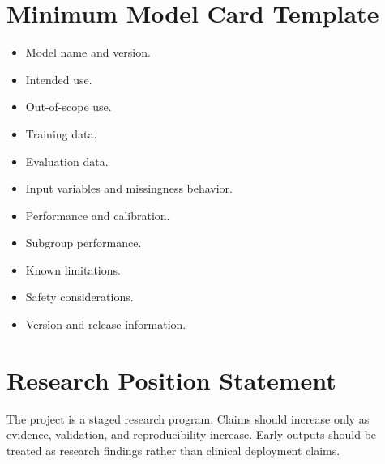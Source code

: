 \documentclass[11pt,journal,onecolumn,draftclsnofoot]{IEEEtran}
\begin{document}
\section{Minimum Model Card Template}
\begin{itemize}
    \item Model name and version.
    \item Intended use.
    \item Out-of-scope use.
    \item Training data.
    \item Evaluation data.
    \item Input variables and missingness behavior.
    \item Performance and calibration.
    \item Subgroup performance.
    \item Known limitations.
    \item Safety considerations.
    \item Version and release information.
\end{itemize}

\section{Research Position Statement}
The project is a staged research program. Claims should increase only as evidence, validation, and reproducibility increase. Early outputs should be treated as research findings rather than clinical deployment claims.
\end{document}
